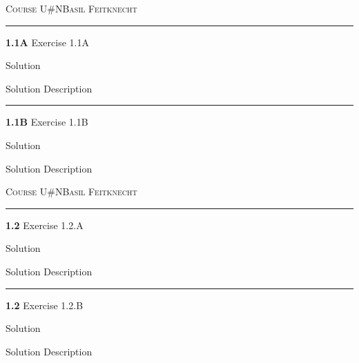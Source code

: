 \documentclass[12pt]{amsart}
\newcommand{\heading}{ {\scshape Course} \hfill U\#N\hfill {\scshape Basil Feitknecht} }
\newcommand{\newexer}{ \bigskip \bigskip \hrule \bigskip \bigskip }
\newcommand{\newpageexcer}{ \newpage \heading \smallskip \hrule \bigskip \bigskip }
\newcommand{\bigbigskip}{ \bigskip \bigskip }
\begin{document}
\newpageexcer

\textbf{1.1A} Exercise 1.1A

\bigbigskip

Solution

\bigbigskip

Solution Description

\newexer

\textbf{1.1B} Exercise 1.1B

\bigbigskip

Solution

\bigbigskip

Solution Description

\newpageexcer

\textbf{1.2} Exercise 1.2.A

\bigbigskip

Solution

\bigbigskip

Solution Description

\newexer

\textbf{1.2} Exercise 1.2.B

\bigbigskip

Solution

\bigbigskip

Solution Description
\end{document}
